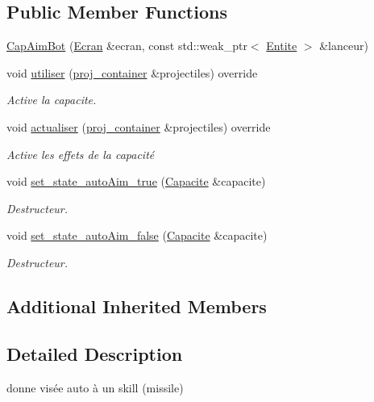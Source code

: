 \subsection*{Public Member Functions}
\begin{DoxyCompactItemize}
\item 
\mbox{\hyperlink{class_cap_aim_bot_ab55c473ea892d3d5a9e94f8e54282db8}{Cap\+Aim\+Bot}} (\mbox{\hyperlink{class_ecran}{Ecran}} \&ecran, const std\+::weak\+\_\+ptr$<$ \mbox{\hyperlink{class_entite}{Entite}} $>$ \&lanceur)
\item 
void \mbox{\hyperlink{class_cap_aim_bot_ad94e41d0b328576b74e802935450c0ad}{utiliser}} (\mbox{\hyperlink{def__type_8h_a87980cd8ee9533e561a73e8bbc728188}{proj\+\_\+container}} \&projectiles) override
\begin{DoxyCompactList}\small\item\em Active la capacite. \end{DoxyCompactList}\item 
void \mbox{\hyperlink{class_cap_aim_bot_a68cc63c8bb28a33989db721c1ed4674d}{actualiser}} (\mbox{\hyperlink{def__type_8h_a87980cd8ee9533e561a73e8bbc728188}{proj\+\_\+container}} \&projectiles) override
\begin{DoxyCompactList}\small\item\em Active les effets de la capacité \end{DoxyCompactList}\item 
void \mbox{\hyperlink{class_cap_aim_bot_a79cd2b5ebd0936e133113d5563c31396}{set\+\_\+state\+\_\+auto\+Aim\+\_\+true}} (\mbox{\hyperlink{class_capacite}{Capacite}} \&capacite)
\begin{DoxyCompactList}\small\item\em Destructeur. \end{DoxyCompactList}\item 
void \mbox{\hyperlink{class_cap_aim_bot_aaa7c76ca67faf851d511c7c46ccc8139}{set\+\_\+state\+\_\+auto\+Aim\+\_\+false}} (\mbox{\hyperlink{class_capacite}{Capacite}} \&capacite)
\begin{DoxyCompactList}\small\item\em Destructeur. \end{DoxyCompactList}\end{DoxyCompactItemize}
\subsection*{Additional Inherited Members}


\subsection{Detailed Description}
donne visée auto à un skill (missile) 

